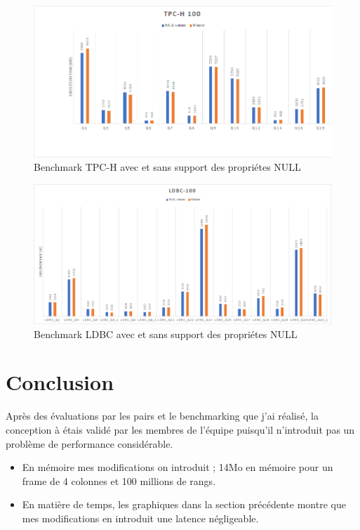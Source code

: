 \begin{figure}[H]  
  \centering
    \includegraphics[width=1.1\textwidth]{chapitre4/Figures/BenchmarkTPCH.png}
  \caption{Benchmark TPC-H avec et sans support des propriétes NULL}
\end{figure}

\begin{figure}[H]  
  \centering
    \includegraphics[width=1.1\textwidth]{chapitre4/Figures/BenchmarkLDBC.png}
  \caption{Benchmark LDBC avec et sans support des propriétes NULL}
\end{figure}

\newpage
\section{Conclusion}
Après des évaluations par les pairs et le benchmarking que j’ai réalisé, la conception à étais validé par les membres de l’équipe puisqu’il n’introduit pas un problème de performance considérable.
\begin{itemize}[label=\textbullet]
\item  En mémoire mes modifications on introduit ; 14Mo en mémoire pour un frame de 4 colonnes et 100 millions de rangs.
\item  En matière de temps, les graphiques dans la section précédente montre que mes modifications en introduit une latence négligeable.
\end{itemize}


